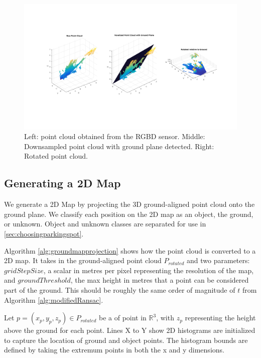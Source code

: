\begin{figure}
\centering
\includegraphics[width=6in]{figures/pointclouds.png}
\caption{Left: point cloud obtained from the RGBD sensor. Middle:
Downsampled point cloud with ground plane detected. Right: Rotated point cloud.}
\label{fig:pointclouds}
\end{figure}

\subsection{Generating a 2D Map}
\label{sec:2dmap}
We generate a 2D Map by projecting the 3D ground-aligned point cloud onto the
ground plane.
We classify each position on the 2D map as an object, the ground, or unknown.
Object and unknown classes are separated for use in
\autoref{sec:choosingparkingspot}.

Algorithm \autoref{alg:groundmapprojection} shows how the point cloud is
converted to a 2D map. It takes in the ground-aligned point cloud $P_{rotated}$
and two parameters: $gridStepSize$, a scalar in metres per pixel representing
the resolution of the map, and $groundThreshold$, the max height in metres that
a point can be considered part of the ground. This should be roughly the same
order of magnitude of $t$ from Algorithm \ref{alg:modifiedRansac}.

Let $p = (x_p, y_p, z_p) \in P_{rotated}$ be a of point in $\mathbb{R}^3$, with
$z_p$ representing the height above the ground for each point. Lines X to Y show
2D histograms are initialized to capture the location of ground and object
points. The histogram bounds are defined by taking the extremum points in both
the x and y dimensions.




